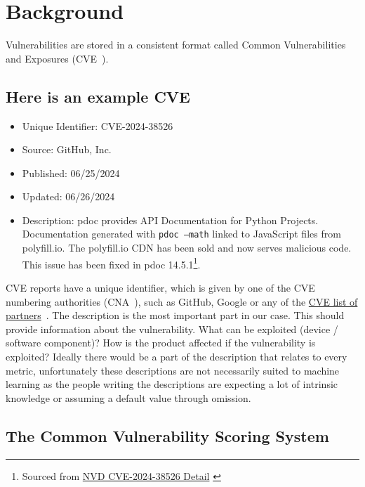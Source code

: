 \section{Background} \label{sec:background}

Vulnerabilities are stored in a consistent format called Common Vulnerabilities and Exposures (CVE~\cite{CVE}).

\subsection{Here is an example CVE}
\begin{itemize}
	\item   Unique Identifier: CVE-2024-38526
	\item   Source: GitHub, Inc.
	\item   Published: 06/25/2024
	\item   Updated: 06/26/2024
	\item   Description: pdoc provides API Documentation for Python Projects. Documentation generated with \texttt{pdoc --math} linked to JavaScript files from polyfill.io. The polyfill.io CDN has been sold and now serves malicious code. This issue has been fixed in pdoc 14.5.1\footnote{ Sourced from \href{https://nvd.nist.gov/vuln/detail/CVE-2024-38526}{NVD CVE-2024-38526 Detail} \cite{polyfill}}. \\

\end{itemize}

\bigskip

CVE reports have a unique identifier, which is given by one of the CVE numbering authorities (CNA~\cite{CNA}), such as GitHub, Google or any of the \href{https://www.cve.org/PartnerInformation/ListofPartners}{CVE list of partners}~\cite{partners}. The description is the most important part in our case. This should provide information about the vulnerability. What can be exploited (device / software component)? How is the product affected if the vulnerability is exploited? Ideally there would be a part of the description that relates to every metric, unfortunately these descriptions are not necessarily suited to machine learning as the people writing the descriptions are expecting a lot of intrinsic knowledge or assuming a default value through omission.

\subsection{The Common Vulnerability Scoring System}

